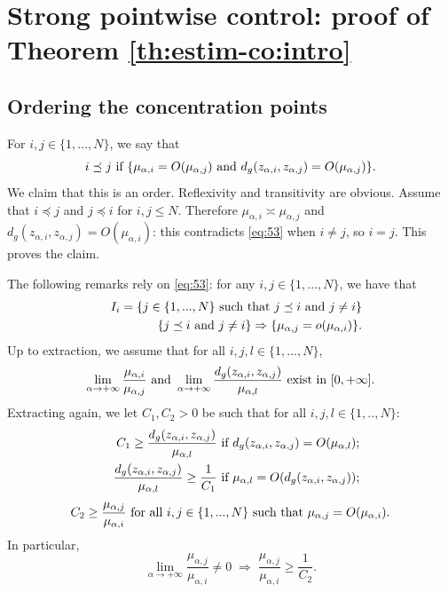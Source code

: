 \documentclass[reqno]{amsart}
\def \mai {\mu_{\alpha,i}}
\def \maj {\mu_{\alpha,j}}
\def \zai {z_{\alpha,i}}
\def \zaj {z_{\alpha,j}}
\def \mal {\mu_{\alpha,l}}
\begin{document}
\section{Strong pointwise control: proof of Theorem \ref{th:estim-co:intro}}\label{sec:strong}

\subsection{Ordering the concentration points}
For $i,j\in \{1,...,N\}$, we say that 
\begin{equation*}
i\preceq j\hbox{ if }\{\mai=O(\maj)\hbox{ and }d_g(\zai,\zaj)=O(\maj)\}.
\end{equation*}
We claim that this is an order. Reflexivity and transitivity are obvious. Assume that $i\preceq j$ and $j\preceq i$ for $i,j\leq N$. Therefore $\mai\asymp\maj$ and $d_g(\zai,\zaj)=O(\mai)$: this contradicts \eqref{eq:53} when $i\neq j$, so $i=j$. This proves the claim.

\smallskip\noindent The following remarks rely on \eqref{eq:53}: for any $i,j\in\{1,...,N\}$, we have that
\begin{eqnarray*}
&&I_i=\{j\in\{1,...,N\}\hbox{ such that }j\preceq i\hbox{ and }j\neq i\}\\
&&\{j\preceq i\hbox{ and }j\neq i\}\Rightarrow \{\maj=o(\mai)\}.
\end{eqnarray*}
Up to extraction, we assume that for all $i,j,l\in \{1,...,N\}$,
$$\lim_{\alpha\to +\infty}\frac{\mai}{\maj}\hbox{ and } \lim_{\alpha\to +\infty}\frac{d_g(\zai,\zaj)}{\mal}\hbox{ exist in }[0,+\infty].$$
Extracting again, we let $C_1,C_2>0$ be such that for all $i,j,l\in\{1,..,N\}$:
\begin{eqnarray}
&&C_1\geq \frac{d_g(\zai,\zaj)}{\mal}\hbox{ if }d_g(\zai,\zaj)=O(\mal);\label{lim:d:1}\\
&& \frac{d_g(\zai,\zaj)}{\mal}\geq \frac{1}{C_1}\hbox{ if }\mal=O(d_g(\zai,\zaj));\nonumber
\end{eqnarray}
\begin{equation}\label{lim:m:1}
C_2\geq\frac{\maj}{\mai}\hbox{ for all } i, j\in \{1,...,N\}\hbox{ such that }\maj=O(\mai).
\end{equation}
In particular, 
\begin{equation*}
\lim_{\alpha\to +\infty}\frac{\maj}{\mai}\neq 0 \; \Rightarrow \; \frac{\maj}{\mai}\geq \frac{1}{C_2}.
\end{equation*}
\end{document}
